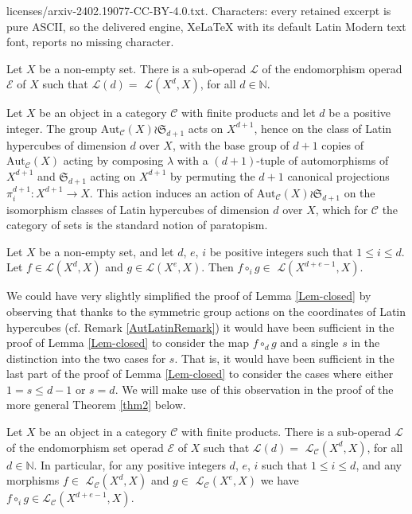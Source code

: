 \documentclass[10pt,a4paper]{amsart}
\def\Aut{\mathrm{Aut}}   \def\bAut{\mathbf{Aut}}        \def\tenk{\otimes_k}
\def\CC{{\mathcal{C}}}    \def\OP{{\mathcal{O}P}}
\def\CE{{\mathcal{E}}}    \def\OR{{\mathcal{O}R}}
\def\CL{{\mathcal{L}}}  \def\bCL{{\mathbf{L}}}
\def\N{{\mathbb N}}
\def\sym{\mathfrak{S}} %
\begin{document}
licenses/arxiv-2402.19077-CC-BY-4.0.txt. Characters: every retained excerpt is pure ASCII, so the delivered engine, XeLaTeX with its default Latin Modern text font, reports no missing character.
\begin{Theorem} \label{thm1}
Let $X$ be a non-empty set. There is a sub-operad $\CL$ of the endomorphism
operad $\CE$ of $X$ such that $\CL(d)=$ $\CL(X^d,X)$, for all  $d\in \N$.
\end{Theorem}

\begin{Remark} \label{AutLatinRemark}
Let $X$ be an object in a category $\CC$ with finite products and let $d$ be a 
positive integer.  The group $\Aut_\CC(X)\wr \sym_{d+1}$ acts on $X^{d+1}$, hence 
on the class of Latin hypercubes of  dimension $d$ over $X$, with the base group of 
$d+1$ copies of $\Aut_\CC(X)$ acting by composing $\lambda$ with a $(d+1)$-tuple 
of automorphisms of $X^{d+1}$ and $\sym_{d+1}$ acting on $X^{d+1}$ by permuting 
the $d+1$ canonical  projections  $\pi^{d+1}_i : X^{d+1}\to X$. This action induces an 
action of $\Aut_\CC(X)\wr \sym_{d+1}$ on the isomorphism classes of Latin 
hypercubes of dimension $d$ over $X$, which for $\CC$ the category of sets is
the standard notion of paratopism.
\end{Remark}

\begin{Lemma}  \label{Lem-closed}
Let $X$ be a non-empty set, and 
let $d$, $e$, $i$ be positive integers such that $1\leq i\leq d$. 
Let $f\in\CL(X^d,X)$ and $g\in\CL(X^e,X)$. 
Then $f\circ_i g\in$ $\CL(X^{d+e-1},X)$.
\end{Lemma}

\begin{Remark} \label{rem1} 
We could have very slightly simplified the proof of Lemma \ref{Lem-closed}
by observing that thanks to the symmetric group actions on the coordinates 
of  Latin hypercubes  (cf. Remark \ref{AutLatinRemark}) it would have been 
sufficient in the proof of Lemma \ref{Lem-closed}  to consider the map 
$f\circ_{d} g$ and a single $s$ in the  distinction into the  two cases  for $s$.  
That is,  it would have been sufficient in the last part of the proof of 
Lemma \ref{Lem-closed}  to consider the cases where  either $1=s\leq d-1$ or 
$s=d$.  We will make use of this observation in the proof of the more general 
Theorem \ref{thm2} below.
\end{Remark}

\begin{Theorem} \label{thm2}
Let $X$ be an object in a category $\CC$ with finite  products. 
There is a sub-operad $\CL$ of the endomorphism set
operad $\CE$ of $X$ such that $\CL(d)=$ $\CL_\CC(X^d,X)$, for all  $d\in \N$.
In particular, for any positive integers $d$, $e$, $i$ such that $1\leq i\leq d$,
and any morphisms $f\in$ $\CL_\CC(X^d,X)$ and $g\in$ $\CL_\CC(X^e,X)$ we have
$f\circ_i g \in \CL_\CC(X^{d+e-1},X)$. 
\end{Theorem}
\end{document}
